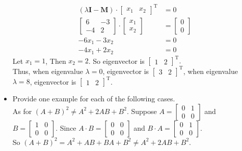 \documentclass{article}
\begin{document}
\begin{itemize}
\begin{align*}
(\lambda \bm{I} - \bm{M}) \cdot \begin{bmatrix}
			x_{1} & x_{2}
		\end{bmatrix}^\mathrm{T} &= 0\\
		\begin{bmatrix}
			6 & -3 \\
			-4 & 2
		\end{bmatrix} \cdot 
		\begin{bmatrix}
			x_{1} \\
			x_{2}
		\end{bmatrix}&= 
			\begin{bmatrix}
				0 \\ 0
			\end{bmatrix}\\
			-6x_{1} - 3x_{2} &= 0\\
			-4x_{1} + 2x_{2} &= 0
\end{align*}
Let $x_{1} = 1$, Then $x_{2} = 2$. So eigenvector is $\begin{bmatrix}
	1 & 2
\end{bmatrix}^{\mathrm{T}}.$\\
Thus, when eigenvalue $\lambda = 0$, eigenvector is $\begin{bmatrix}
	3 & 2
\end{bmatrix}^{\mathrm{T}}$, when eigenvalue $\lambda = 8$, eigenvector is $\begin{bmatrix}
	1 & 2
\end{bmatrix}^{\mathrm{T}}$.\\
\item Provide one example for each of the following cases.\\
As for $(A + B)^2 \not= A^2 + 2AB + B^2$. Suppose $A=\begin{bmatrix}
	0 & 1\\0&0
\end{bmatrix}$ and $B=\begin{bmatrix}
	1 & 0\\0&0
\end{bmatrix}$. Since $A\cdot B = \begin{bmatrix}
	0 & 0\\0&0
\end{bmatrix}$ and $B\cdot A = \begin{bmatrix}
	0 & 1\\0&0
\end{bmatrix}$.\\
So $(A + B)^2 = A ^ 2 + AB + BA + B^2 \not= A^2 + 2AB + B^2.$\\

\end{itemize}
\end{document}
